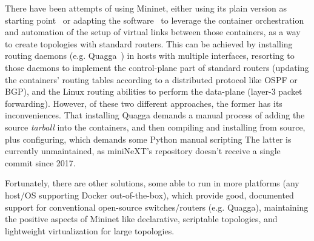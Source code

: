 There have been attempts of using Mininet, either using its plain version as starting point~\cite{mininetquagga,mininetospfbgp} or adapting the software~\cite{mininext} to leverage the container orchestration and automation of the setup of virtual links between those containers, as a way to create topologies with standard routers.
This can be achieved by installing routing daemons (e.g. Quagga~\cite{quagga}) in hosts with multiple interfaces, resorting to those daemons to implement the control-plane part of standard routers (updating the containers' routing tables according to a distributed protocol like OSPF or BGP), and the Linux routing abilities to perform the data-plane (layer-3 packet forwarding). %
However, of these two different approaches, the former has its inconveniences.
That installing Quagga demands a manual process of adding the source \emph{tarball} into the containers, and then compiling and installing from source, plus configuring, which demands some Python manual scripting
The latter is currently unmaintained, as miniNeXT's repository doesn't receive a single commit since 2017.

Fortunately, there are other solutions, some able to run in more platforms (any host/OS supporting Docker out-of-the-box), which provide good, documented support for conventional open-source switches/routers (e.g. Quagga), maintaining the positive aspects of Mininet like declarative, scriptable topologies, and lightweight virtualization for large topologies.

